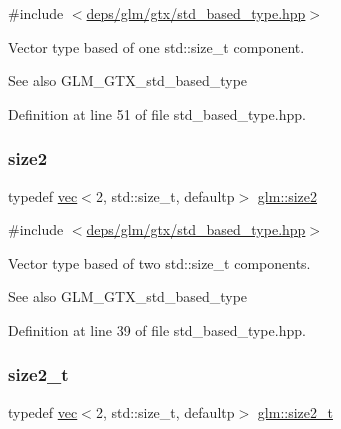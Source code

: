 {\ttfamily \#include $<$\hyperlink{std__based__type_8hpp}{deps/glm/gtx/std\+\_\+based\+\_\+type.\+hpp}$>$}

Vector type based of one std\+::size\+\_\+t component. \begin{DoxySeeAlso}{See also}
G\+L\+M\+\_\+\+G\+T\+X\+\_\+std\+\_\+based\+\_\+type 
\end{DoxySeeAlso}


Definition at line 51 of file std\+\_\+based\+\_\+type.\+hpp.

\mbox{\label{group__gtx__std__based__type_ga432937b68775c79e4556150e769c6e6b}} 
\subsubsection{\texorpdfstring{size2}{size2}}
{\footnotesize\ttfamily typedef \hyperlink{structglm_1_1vec}{vec}$<$2, std\+::size\+\_\+t, defaultp$>$ \hyperlink{group__gtx__std__based__type_ga432937b68775c79e4556150e769c6e6b}{glm\+::size2}}



{\ttfamily \#include $<$\hyperlink{std__based__type_8hpp}{deps/glm/gtx/std\+\_\+based\+\_\+type.\+hpp}$>$}

Vector type based of two std\+::size\+\_\+t components. \begin{DoxySeeAlso}{See also}
G\+L\+M\+\_\+\+G\+T\+X\+\_\+std\+\_\+based\+\_\+type 
\end{DoxySeeAlso}


Definition at line 39 of file std\+\_\+based\+\_\+type.\+hpp.

\mbox{\label{group__gtx__std__based__type_ga701549a040be1f2f6f661ddecde337de}} 
\subsubsection{\texorpdfstring{size2\+\_\+t}{size2\_t}}
{\footnotesize\ttfamily typedef \hyperlink{structglm_1_1vec}{vec}$<$2, std\+::size\+\_\+t, defaultp$>$ \hyperlink{group__gtx__std__based__type_ga701549a040be1f2f6f661ddecde337de}{glm\+::size2\+\_\+t}}



